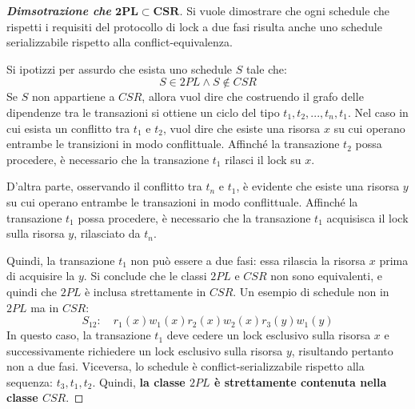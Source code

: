 \documentclass[a4paper]{article}
\begin{document}
	\begin{proof}[\textbf{Dimsotrazione che} $\boldsymbol{2PL \subset CSR}$]
		Si vuole dimostrare che ogni schedule che rispetti i requisiti del protocollo di lock a due fasi risulta anche uno schedule serializzabile rispetto alla conflict-equivalenza.\newline
		
		\noindent
		Si ipotizzi per assurdo che esista uno schedule $S$ tale che:
		\begin{equation*}
			S \in 2PL \land S \notin CSR
		\end{equation*}
		Se $S$ non appartiene a $CSR$, allora vuol dire che costruendo il grafo delle dipendenze tra le transazioni si ottiene un ciclo del tipo $t_{1}, t_{2}, ..., t_{n}, t_{1}$. Nel caso in cui esista un conflitto tra $t_{1}$ e $t_{2}$, vuol dire che esiste una risorsa $x$ su cui operano entrambe le transizioni in modo conflittuale. Affinché la transazione $t_{2}$ possa procedere, è necessario che la transazione $t_{1}$ rilasci il lock su $x$.
		
		D'altra parte, osservando il conflitto tra $t_{n}$ e $t_{1}$, è evidente che esiste una risorsa $y$ su cui operano entrambe le transazioni in modo conflittuale. Affinché la transazione $t_{1}$ possa procedere, è necessario che la transazione $t_{1}$ acquisisca il lock sulla risorsa $y$, rilasciato da $t_{n}$.\newline
		
		\noindent
		Quindi, la transazione $t_{1}$ non può essere a due fasi: essa rilascia la risorsa $x$ prima di acquisire la $y$. Si conclude che le classi $2PL$ e $CSR$ non sono equivalenti, e quindi che $2PL$ è inclusa strettamente in $CSR$. Un esempio di schedule non in $2PL$ ma in $CSR$:
		\begin{equation*}
			S_{12}: \hspace{1em} r_{1}\left(x\right) w_{1}\left(x\right) r_{2}\left(x\right) w_{2}\left(x\right) r_{3}\left(y\right) w_{1}\left(y\right)
		\end{equation*}
		In questo caso, la transazione $t_{1}$ deve cedere un lock esclusivo sulla risorsa $x$ e successivamente richiedere un lock esclusivo sulla risorsa $y$, risultando pertanto non a due fasi. Viceversa, lo schedule è conflict-serializzabile rispetto alla sequenza: $t_{3}, t_{1}, t_{2}$. Quindi, \textbf{la classe $2PL$ è strettamente contenuta nella classe $CSR$}.
	\end{proof}\newpage
	
\end{document}
